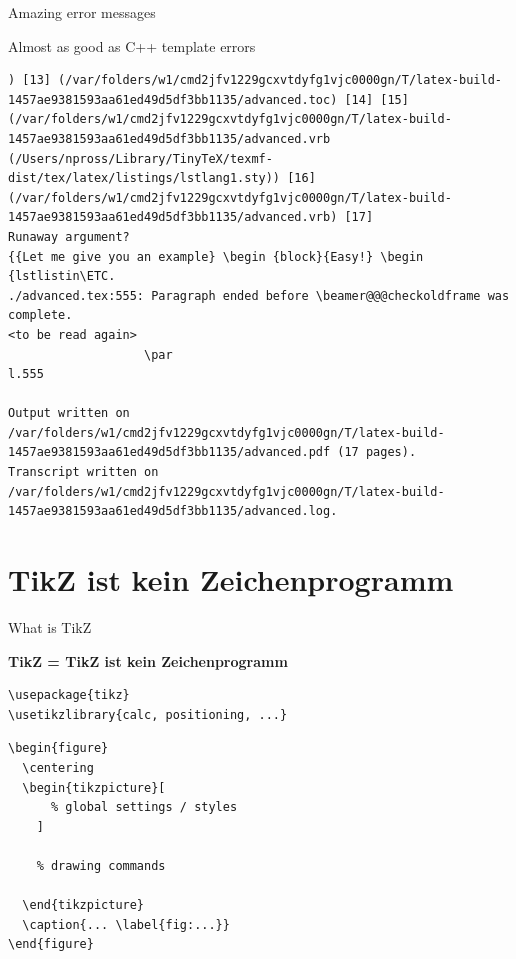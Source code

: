 \documentclass[aspectratio=169]{beamer}
\begin{document}
\begin{frame}[fragile]{Amazing error messages}
  \begin{block}{Almost as good as C++ template errors}
    \footnotesize
    \begin{verbatim}
) [13] (/var/folders/w1/cmd2jfv1229gcxvtdyfg1vjc0000gn/T/latex-build-1457ae9381593aa61ed49d5df3bb1135/advanced.toc) [14] [15] (/var/folders/w1/cmd2jfv1229gcxvtdyfg1vjc0000gn/T/latex-build-1457ae9381593aa61ed49d5df3bb1135/advanced.vrb (/Users/npross/Library/TinyTeX/texmf-dist/tex/latex/listings/lstlang1.sty)) [16] (/var/folders/w1/cmd2jfv1229gcxvtdyfg1vjc0000gn/T/latex-build-1457ae9381593aa61ed49d5df3bb1135/advanced.vrb) [17]
Runaway argument?
{{Let me give you an example} \begin {block}{Easy!} \begin {lstlistin\ETC.
./advanced.tex:555: Paragraph ended before \beamer@@@checkoldframe was complete.
<to be read again> 
                   \par 
l.555 
      
Output written on /var/folders/w1/cmd2jfv1229gcxvtdyfg1vjc0000gn/T/latex-build-1457ae9381593aa61ed49d5df3bb1135/advanced.pdf (17 pages).
Transcript written on /var/folders/w1/cmd2jfv1229gcxvtdyfg1vjc0000gn/T/latex-build-1457ae9381593aa61ed49d5df3bb1135/advanced.log.
    \end{verbatim}
  \end{block}
\end{frame}

\section{TikZ ist kein Zeichenprogramm}

\begin{frame}[fragile]{What is TikZ}

{\Large\bfseries TikZ = TikZ ist kein Zeichenprogramm}
\begin{lstlisting}[basicstyle=\ttfamily\scriptsize]
\usepackage{tikz}
\usetikzlibrary{calc, positioning, ...}
\end{lstlisting}
\begin{lstlisting}[basicstyle=\ttfamily\scriptsize]
\begin{figure}
  \centering
  \begin{tikzpicture}[
      % global settings / styles
    ]

    % drawing commands

  \end{tikzpicture}
  \caption{... \label{fig:...}}
\end{figure}
\end{lstlisting}
\end{frame}
\end{document}
